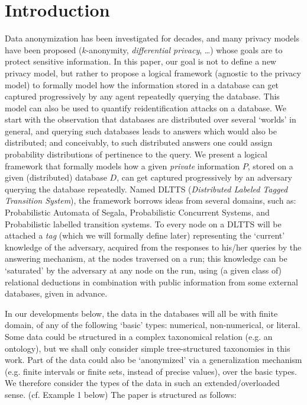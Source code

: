 \documentclass[pdflatex]{article}
\begin{document}
 \section{ { \large Introduction} }
 
 Data anonymization has been investigated for decades, and many privacy
models have been proposed ($k$-anonymity, \emph{differential privacy}, \ldots)
whose goals are to protect sensitive information. In this paper, our goal is not to
define a new privacy  model, but rather to propose a logical framework (agnostic
to the privacy model) to formally
model how the information stored in a database can get captured progressively by
any agent repeatedly querying the database. This model can also be used to quantify
reidentification attacks on a database. We start  with the observation that
databases  are  distributed over several `worlds' in general, and querying such
databases leads to answers which would also be distributed; and conceivably, to such
distributed  answers  one could assign probability distributions  of pertinence to  the
query.   We present a  logical framework that formally  models how a given
{\em private}  information $P$, stored on a  given (distributed) database $D$,
can get captured  progressively   by an  adversary  querying  the   database
repeatedly.  Named DLTTS   ({\em Distributed  Labeled Tagged Transition System}),
the  framework borrows  ideas  from  several domains, such as:
  Probabilistic Automata  of  Segala, Probabilistic  Concurrent  Systems,  and
  Probabilistic  labelled transition systems.
  To every node on a DLTTS will be attached a  {\em tag} (which we will formally
  define later) representing the `current'
  knowledge of the adversary, acquired from the responses  to his/her queries by
  the answering mechanism, at the nodes  traversed  on a run;   this  knowledge can
  be `saturated'  by the adversary  at any node on the run,   using (a given class of)
  relational  deductions  in combination  with public  information   from some  external
  databases, given in  advance.
  
  In our developments below, the  data in the databases will all be  with finite
  domain,  of any  of the following `basic'  types: numerical, non-numerical,
  or  literal. Some data could be structured in a complex taxonomical relation
  (e.g. an ontology), but  we shall only consider simple tree-structured taxonomies
  in this work.  Part of  the data  could also be  `anonymized' via a generalization
  mechanism (e.g. finite intervals or   finite  sets, instead of precise values), over
  the   basic types.  We therefore consider the   types of  the data  in such an
  extended/overloaded sense. (cf. Example 1 below) 
  The paper is structured as follows:
  
\end{document}
